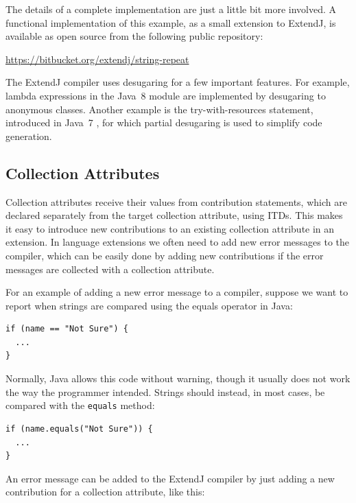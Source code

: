 \documentclass[10pt, twoside, openright]{book}
\begin{document}
\noindent
The details of a complete implementation are just a little bit more involved.
A functional implementation of this example, as a small extension to ExtendJ,
is available as open source from the following public repository:

\begin{center}
\url{https://bitbucket.org/extendj/string-repeat}
\end{center}

The ExtendJ compiler uses desugaring for a few important features. For example, lambda expressions
in the Java~8 module are implemented by desugaring to anonymous classes.
Another example is the try-with-resources statement, introduced in Java~7 \cite[\S 14.20.3]{jls7},
for which partial desugaring is used to simplify code generation.


\subsection{Collection Attributes}
\label{sec:coll-prop}

Collection attributes receive their values from contribution statements, which are declared separately
from the target collection attribute, using ITDs. This makes it easy to introduce new
contributions to an existing collection attribute in an extension.
In language extensions we often need to add new error messages to the compiler, which can be easily
done by adding new contributions if the error messages are collected with a collection attribute.

For an example of adding a new error message to a compiler, suppose we want to
report when strings are compared using the equals operator in Java:

\begin{lstlisting}
if (name == "Not Sure") {
  ...
}
\end{lstlisting}

\noindent
Normally, Java allows this code without warning, though it usually does not work the way
the programmer intended. Strings should instead, in most cases, be compared with the \verb'equals'
method:

\begin{lstlisting}
if (name.equals("Not Sure")) {
  ...
}
\end{lstlisting}

\noindent
An error message can be added to the ExtendJ compiler by just adding a new contribution
for a collection attribute, like this:
\end{document}
